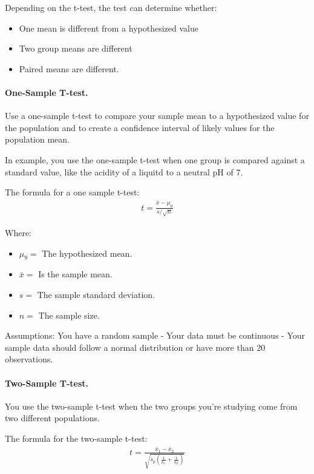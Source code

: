 \documentclass[11pt]{article}
\begin{document}
Depending on the t-test, the test can determine whether:
\begin{itemize}
  \item One mean is different from a hypothesized value
  \item Two group means are different
  \item Paired means are different.
\end{itemize}

\hypertarget{one-sample-t-test.}{%
\paragraph{One-Sample T-test.}\label{one-sample-t-test.}}

Use a one-sample t-test to compare your sample mean to a hypothesized
value for the population and to create a confidence interval of likely
values for the population mean.

In example, you use the one-sample t-test when one group is compared against
a standard value, like the acidity of a liquitd to a neutral pH of 7. 

The formula for a one sample t-test: 
\begin{gather}
  t = \frac{\bar x - \mu_0}{s / \sqrt n}
\end{gather}

Where:
\begin{itemize}
  \item \(\mu_9 = \) The hypothesized mean. 
  \item \(\bar x = \) Is the sample mean. 
  \item \(s =\) The sample standard deviation. 
  \item \(n =\) The sample size. 
\end{itemize}

Assumptions: You have a random sample - Your data must be
continuous - Your sample data should follow a normal distribution or
have more than 20 observations.

\hypertarget{two-sample-t-test.}{%
\paragraph{Two-Sample T-test.}\label{two-sample-t-test.}}

You use the two-sample t-test when the two groups you're studying come from two
different populations.

The formula for the two-sample t-test:
\begin{gather}
  t = \frac{\bar x_1 - \bar x_2}{\sqrt{s_p \left (\frac{1}{n_1} + \frac{1}{n_2}\right )}}
\end{gather}
\end{document}
